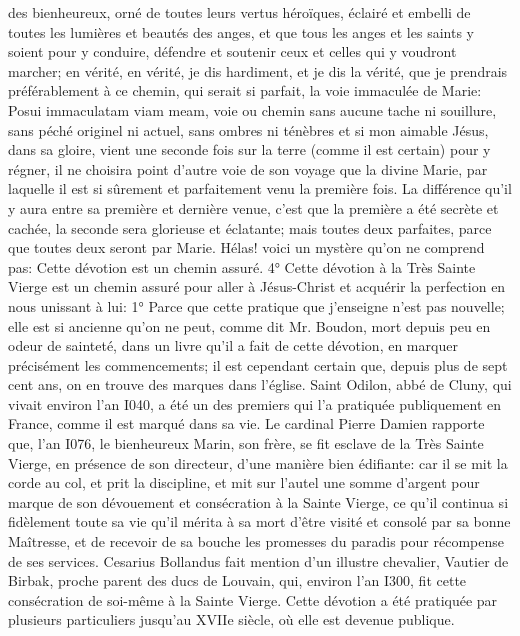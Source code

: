 des bienheureux, orné de toutes leurs vertus héroïques, éclairé et embelli de toutes les lumières et beautés des
anges, et que tous les anges et les saints y soient pour y conduire, défendre et soutenir ceux et celles qui y
voudront marcher; en vérité, en vérité, je dis hardiment, et je dis la vérité, que je prendrais préférablement à ce
chemin, qui serait si parfait, la voie immaculée de Marie: Posui immaculatam viam meam, voie ou chemin sans
aucune tache ni souillure, sans péché originel ni actuel, sans ombres ni ténèbres et si mon aimable Jésus, dans sa
gloire, vient une seconde fois sur la terre (comme il est certain) pour y régner, il ne choisira point d'autre voie de
son voyage que la divine Marie, par laquelle il est si sûrement et parfaitement venu la première fois. La différence
qu'il y aura entre sa première et dernière venue, c'est que la première a été secrète et cachée, la seconde sera
glorieuse et éclatante; mais toutes deux parfaites, parce que toutes deux seront par Marie. Hélas! voici un mystère
qu'on ne comprend pas: 
Cette dévotion est un chemin assuré.
 4° Cette dévotion à la Très Sainte Vierge est un chemin assuré pour aller à Jésus-Christ et acquérir la
perfection en nous unissant à lui:
1° Parce que cette pratique que j'enseigne n'est pas nouvelle; elle est si ancienne qu'on ne peut, comme dit Mr.
Boudon, mort depuis peu en odeur de sainteté, dans un livre qu'il a fait de cette dévotion, en marquer précisément
les commencements; il est cependant certain que, depuis plus de sept cent ans, on en trouve des marques dans
l'église.
Saint Odilon, abbé de Cluny, qui vivait environ l'an I040, a été un des premiers qui l'a pratiquée publiquement en
France, comme il est marqué dans sa vie.
Le cardinal Pierre Damien rapporte que, l'an I076, le bienheureux Marin, son frère, se fit esclave de la Très Sainte
Vierge, en présence de son directeur, d'une manière bien édifiante: car il se mit la corde au col, et prit la discipline,
et mit sur l'autel une somme d'argent pour marque de son dévouement et consécration à la Sainte Vierge, ce qu'il
continua si fidèlement toute sa vie qu'il mérita à sa mort d'être visité et consolé par sa bonne Maîtresse, et de
recevoir de sa bouche les promesses du paradis pour récompense de ses services.
Cesarius Bollandus fait mention d'un illustre chevalier, Vautier de Birbak, proche parent des ducs de Louvain, qui,
environ l'an I300, fit cette consécration de soi-même à la Sainte Vierge. Cette dévotion a été pratiquée par
plusieurs particuliers jusqu'au XVIIe siècle, où elle est devenue publique.
